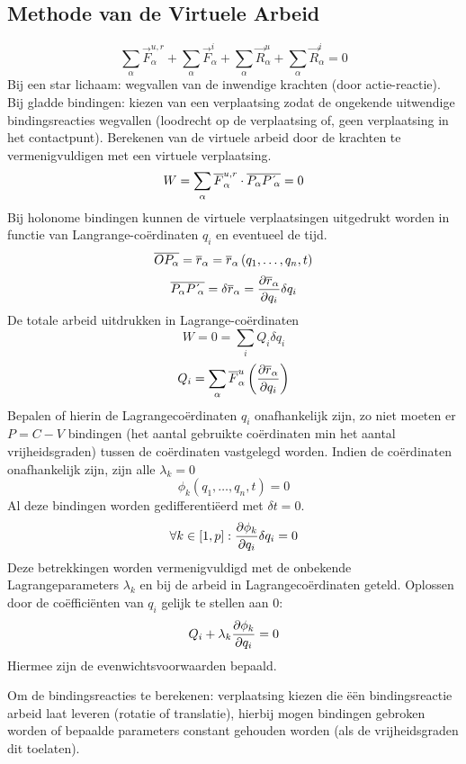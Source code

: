 \subsection{Methode van de Virtuele Arbeid}
\label{sec:MethodeVanDeVirtueleArbeid}
\[
  \sum_{\alpha} \vec{F}_{\alpha}^{u,r} + 
  \sum_{\alpha} \vec{F}_{\alpha}^{i} + 
  \sum_{\alpha} \vec{R}_{\alpha}^{u} + 
  \sum_{\alpha} \vec{R}_{\alpha}^{i} = 0
\]
Bij een star lichaam: wegvallen van de inwendige krachten (door actie-reactie). Bij gladde bindingen: kiezen van een verplaatsing zodat de ongekende uitwendige bindingsreacties wegvallen (loodrecht op de verplaatsing of, geen verplaatsing in het contactpunt).  Berekenen van de virtuele arbeid door de krachten te vermenigvuldigen met een virtuele verplaatsing.
\[
  W = \sum_{\alpha} \overline{F}_{\alpha}^{u,r} \cdot \overline{P_{\alpha} P\,\acute{}_{\alpha}} 
       = 0
\]
Bij holonome bindingen kunnen de virtuele verplaatsingen uitgedrukt worden in functie van Langrange-coërdinaten $q_i$ en eventueel de tijd.
\[
  \overline{OP_{\alpha}} = \overline{r}_{\alpha} = \overline{r}_{\alpha} \left(q_1, \ldots, q_n, t \right)
\]
\[
  \overline{P_{\alpha}P\,\acute{}_{\alpha}} = \delta \overline{r}_{\alpha} = \frac{\partial \overline{r}_{\alpha}}{\partial q_i}\delta q_i
\]
De totale arbeid uitdrukken in Lagrange-coërdinaten
\[
  W = 0 = \sum_i Q_i \delta q_i
\]
\[
  Q_i = \sum_{\alpha} \overline{F}^u_{\alpha} \left( \frac{\partial \overline{r}_{\alpha}}{\partial q_i} \right)
\]
Bepalen of hierin de Lagrangecoërdinaten $q_i$ onafhankelijk zijn, zo niet moeten er $P=C-V$ bindingen (het aantal gebruikte coërdinaten min het aantal vrijheidsgraden) tussen de coërdinaten vastgelegd worden. Indien de coërdinaten onafhankelijk zijn, zijn alle $\lambda_k = 0$
\[
  \phi_k \left(q_1, \ldots, q_n, t \right) = 0
\]
Al deze bindingen worden gedifferentiëerd met $\delta t = 0$.
\[
 \forall k \in \left[1, p\right] : \frac{\partial \phi_k}{\partial q_i} \delta q_i = 0
\]
Deze betrekkingen worden vermenigvuldigd met de onbekende Lagrangeparameters $\lambda_k$ en bij de arbeid in Lagrangecoërdinaten geteld.
Oplossen door de coëfficiënten van $q_i$ gelijk te stellen aan $0$:
\[
  Q_i + \lambda_k \frac{\partial \phi_k}{\partial q_i} = 0
\]
Hiermee zijn de evenwichtsvoorwaarden bepaald.

Om de bindingsreacties te berekenen: verplaatsing kiezen die ëën bindingsreactie arbeid laat leveren (rotatie of translatie), hierbij mogen bindingen gebroken worden of bepaalde parameters constant gehouden worden (als de vrijheidsgraden dit toelaten).


